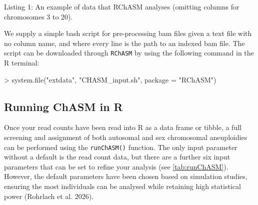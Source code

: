 \documentclass[
  letterpaper,
  DIV=11,
  numbers=noendperiod]{scrartcl}
\newenvironment{Shaded}{\begin{snugshade}}{\end{snugshade}}
\newcommand{\AttributeTok}[1]{\textcolor[rgb]{0.40,0.45,0.13}{#1}}
\newcommand{\FunctionTok}[1]{\textcolor[rgb]{0.28,0.35,0.67}{#1}}
\newcommand{\NormalTok}[1]{\textcolor[rgb]{0.00,0.23,0.31}{#1}}
\newcommand{\SpecialCharTok}[1]{\textcolor[rgb]{0.37,0.37,0.37}{#1}}
\newcommand{\StringTok}[1]{\textcolor[rgb]{0.13,0.47,0.30}{#1}}
\begin{document}
Listing 1: An example of data that RChASM analyses (omitting columns for
chromosomes 3 to 20).

We supply a simple bash script for pre-processing bam files given a text
file with no column name, and where every line is the path to an indexed
bam file. The script can be downloaded through \texttt{RChASM} by using
the following command in the R terminal:

\begin{Shaded}
\begin{Highlighting}[]
\SpecialCharTok{\textgreater{}} \FunctionTok{system.file}\NormalTok{(}\StringTok{"extdata"}\NormalTok{, }\StringTok{"CHASM\_input.sh"}\NormalTok{, }\AttributeTok{package =} \StringTok{"RChASM"}\NormalTok{)}
\end{Highlighting}
\end{Shaded}

\subsection{Running ChASM in R}\label{running-chasm-in-r}

Once your read counts have been read into R as a data frame or tibble, a
full screening and assignment of both autosomal and sex chromosomal
aneuploidies can be performed using the \texttt{runChASM()} function.
The only input parameter without a default is the read count data, but
there are a further six input parameters that can be set to refine your
analysis (see \autoref{tab:runChASM}). However, the default parameters
have been chosen based on simulation studies, ensuring the most
individuals can be analysed while retaining high statistical power
(Rohrlach et al. 2026).
\end{document}
